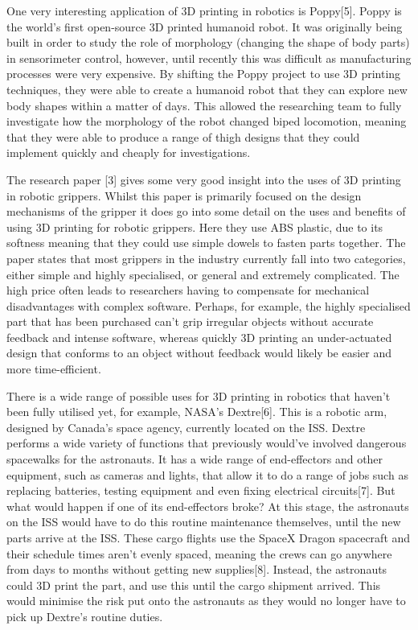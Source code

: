 \documentclass{l4proj}
\begin{document}
One very interesting application of 3D printing in robotics is Poppy[5]. Poppy is the world's first open-source 3D printed humanoid robot. It was originally being built in order to study the role of morphology (changing the shape of body parts) in sensorimeter control, however, until recently this was difficult as manufacturing processes were very expensive. By shifting the Poppy project to use 3D printing techniques, they were able to create a humanoid robot that they can explore new body shapes within a matter of days. This allowed the researching team to fully investigate how the morphology of the robot changed biped locomotion, meaning that they were able to produce a range of thigh designs that they could implement quickly and cheaply for investigations.

The research paper [3] gives some very good insight into the uses of 3D printing in robotic grippers. Whilst this paper is primarily focused on the design mechanisms of the gripper it does go into some detail on the uses and benefits of using 3D printing for robotic grippers. Here they use ABS plastic, due to its softness meaning that they could use simple dowels to fasten parts together. The paper states that most grippers in the industry currently fall into two categories, either simple and highly specialised, or general and extremely complicated. The high price often leads to researchers having to compensate for mechanical disadvantages with complex software. Perhaps, for example, the highly specialised part that has been purchased can't grip irregular objects without accurate feedback and intense software, whereas quickly 3D printing an under-actuated design that conforms to an object without feedback would likely be easier and more time-efficient. 

There is a wide range of possible uses for 3D printing in robotics that haven't been fully utilised yet, for example, NASA's Dextre[6]. This is a robotic arm, designed by Canada's space agency, currently located on the ISS. Dextre performs a wide variety of functions that previously would've involved dangerous spacewalks for the astronauts. It has a wide range of end-effectors and other equipment, such as cameras and lights, that allow it to do a range of jobs such as replacing batteries, testing equipment and even fixing electrical circuits[7]. But what would happen if one of its end-effectors broke? At this stage, the astronauts on the ISS would have to do this routine maintenance themselves, until the new parts arrive at the ISS. These cargo flights use the SpaceX Dragon spacecraft and their schedule times aren't evenly spaced, meaning the crews can go anywhere from days to months without getting new supplies[8]. Instead, the astronauts could 3D print the part, and use this until the cargo shipment arrived. This would minimise the risk put onto the astronauts as they would no longer have to pick up Dextre's routine duties. 
\end{document}

